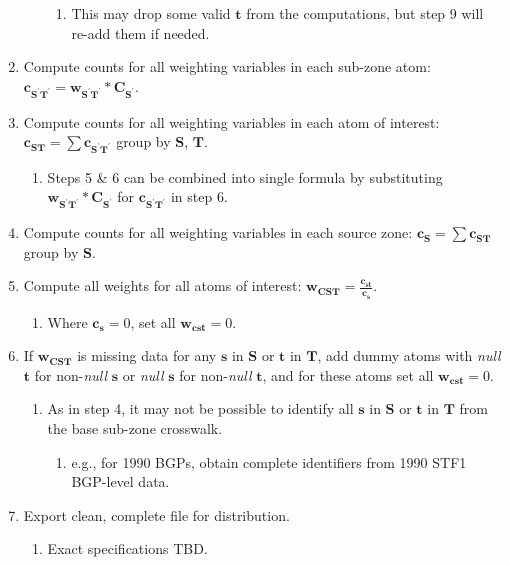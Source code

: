 \documentclass{article}
\begin{document}
\begin{enumerate}
\begin{enumerate}
      \begin{enumerate}
      \item This may drop some valid $\bm{t}$ from the computations, but step 9 will re-add them if needed.
      \end{enumerate}
   \end{enumerate}
\item Compute counts for all weighting variables in each sub-zone atom: $\mathbf{c_{\mathbf{S^\prime T^\prime}}} = \mathbf{w_{\mathbf{S^\prime T^\prime}}} * \mathbf{C_{\mathbf{S^\prime}}}$.
\item Compute counts for all weighting variables in each atom of interest: $\mathbf{c_{\mathbf{ST}}} = \sum \mathbf{c_{\mathbf{S^\prime T^\prime}}}$ group by $\mathbf{S}$, $\mathbf{T}$.
  \begin{enumerate}
  \item Steps 5 \& 6 can be combined into single formula by substituting $\mathbf{w_{\mathbf{S^\prime T^\prime}}} * \mathbf{C_{\mathbf{S^\prime}}}$ for $\mathbf{c_{\mathbf{S^\prime T^\prime}}}$ in step 6.
  \end{enumerate}
\item Compute counts for all weighting variables in each source zone: $\mathbf{c_{\mathbf{S}}} = \sum \mathbf{c_{\mathbf{ST}}}$ group by $\mathbf{S}$.
\item Compute all weights for all atoms of interest: $\mathbf{w_{\mathbf{CST}}} = \displaystyle \frac{\mathbf{c_{st}}}{\mathbf{c_{s}}}$.
  \begin{enumerate}
  \item Where $\bm{c_{s}} = 0$, set all $\bm{w_{\bm{cst}}} = 0$.
  \end{enumerate}
\item If $\mathbf{w_{\mathbf{CST}}}$ is missing data for any $\bm{s}$ in $\mathbf{S}$ or $\bm{t}$ in $\mathbf{T}$, add dummy atoms with \textit{null} $\bm{t}$ for non-\textit{null} $\bm{s}$ or \textit{null} $\bm{s}$ for non-\textit{null} $\bm{t}$, and for these atoms set all $\bm{w_{\bm{cst}}} = 0$.
  \begin{enumerate}
  \item As in step 4, it may not be possible to identify all $\bm{s}$ in $\mathbf{S}$ or $\bm{t}$ in $\mathbf{T}$ from the base sub-zone crosswalk.
    \begin{enumerate}
    \item e.g., for 1990 BGPs, obtain complete identifiers from 1990 STF1 BGP-level data.
    \end{enumerate}
  \end{enumerate}
\item Export clean, complete file for distribution.
  \begin{enumerate}
  \item Exact specifications TBD.
  \end{enumerate}
\end{enumerate}
\end{document}
